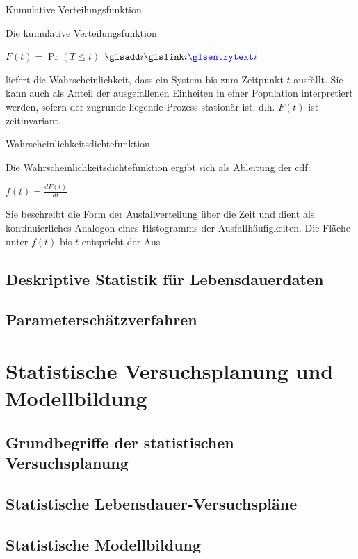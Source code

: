 Kumulative Verteilungsfunktion

Die kumulative Verteilungsfunktion

$ F(t) = \Pr(T \leq t)$
$\sym{i}$

liefert die Wahrscheinlichkeit, dass ein System bis zum Zeitpunkt $t$ ausfällt. Sie kann auch als Anteil der ausgefallenen Einheiten in einer Population interpretiert werden, sofern der zugrunde liegende Prozess stationär ist, d.h. $F(t)$ ist zeitinvariant.



Wahrscheinlichkeitsdichtefunktion

Die Wahrscheinlichkeitsdichtefunktion ergibt sich als Ableitung der cdf:

$f(t) = \frac{dF(t)}{dt}$

Sie beschreibt die Form der Ausfallverteilung über die Zeit und dient als kontinuierliches Analogon eines Histogramms der Ausfallhäufigkeiten. Die Fläche unter $f(t)$ bis $t$ entspricht der Aus


\subsection{Deskriptive Statistik für Lebensdauerdaten} \label{subsec:stat}

\subsection{Parameterschätzverfahren} \label{subsec:schätzer}

\section{Statistische Versuchsplanung und Modellbildung} \label{sec:doe}

\subsection{Grundbegriffe der statistischen Versuchsplanung} \label{subsec:begriffedoe}

\subsection{Statistische Lebensdauer-Versuchspläne} \label{subsec:pläne}

\subsection{Statistische Modellbildung} \label{subsec:model}
